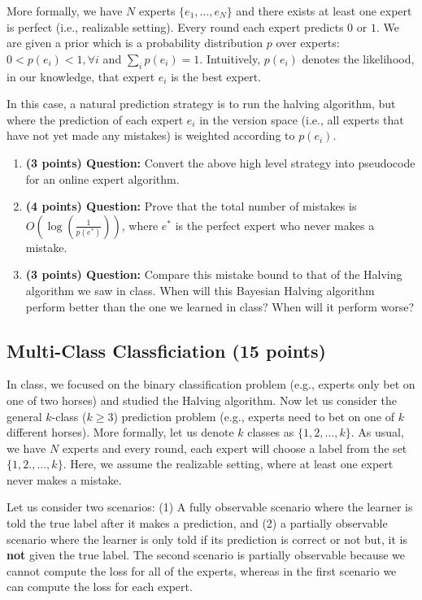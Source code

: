 \documentclass{article}
\begin{document}
More formally, we have $N$ experts $\{e_1,...,e_N\}$ and there exists at least one expert is perfect (i.e., realizable setting). Every round each expert predicts $0$ or $1$.  We are given a prior which is a probability distribution $p$ over experts: $0 < p(e_i)< 1, \forall i$ and $\sum_{i}p(e_i) = 1$. Intuitively, $p(e_i)$ denotes the likelihood, in our knowledge, that expert $e_i$ is the best expert.

In this case, a natural prediction strategy is to run the halving algorithm, but where the prediction of each expert $e_i$ in the version space (i.e., all experts that have not yet made any mistakes) is weighted according to $p(e_i)$.

\begin{enumerate}
    \item \textbf{(3 points) Question:} Convert the above high level strategy into pseudocode for an online expert algorithm. 

    \item \textbf{(4 points) Question:} Prove that the total number of mistakes is $O(\log(\frac{1}{p(e^*)}))$, where $e^*$ is the perfect expert who never makes a mistake. 
    
    \item \textbf{(3 points) Question:} Compare this mistake bound to that of the Halving algorithm we saw in class. When will this Bayesian Halving algorithm perform better than the one we learned in class? When will it perform worse?
    
\end{enumerate}

\subsection{Multi-Class Classficiation (15 points)}
In class, we focused on the binary classification problem (e.g., experts only bet on one of two horses) and studied the Halving algorithm. Now let us consider the general $k$-class ($k\geq 3$) prediction problem (e.g., experts need to bet on one of $k$ different horses).   More formally, let us denote $k$ classes as $\{1, 2, ..., k\}$. As usual, we have $N$ experts and every round, each expert will choose a label from the set $\{1,2.,...,k\}$. Here, we assume the realizable setting, where at least one expert never makes a mistake.

Let us consider two scenarios: (1) A fully observable scenario where the learner is told the true label after it makes a prediction, and (2) a partially observable scenario where the learner is only told if its prediction is correct or not but, it is \textbf{not} given the true label. The second scenario is partially observable because we cannot compute the loss for all of the experts, whereas in the first scenario we can compute the loss for each expert.
\end{document}

